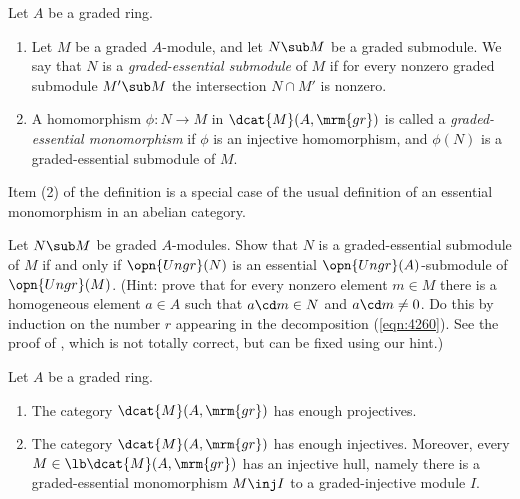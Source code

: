 \begin{dfn} \label{dfn:4260}
Let $A$ be a graded ring.
\begin{enumerate}
\item Let $M$ be a graded $A$-module, and let $N \sub M$ 
be a graded submodule. We say that $N$ is a 
{\em graded-essential submodule}%
of $M$ if for every nonzero graded submodule $M' \sub M$ the intersection 
$N \cap M'$ is nonzero. 

\item A homomorphism $\phi : N \to M$ in $\dcat{M}(A, \mrm{gr})$
is called a {\em graded-essential monomorphism}%
if $\phi$ is an injective 
homomorphism, and $\phi(N)$ is a graded-essential submodule of $M$.
\end{enumerate}
\end{dfn}

Item (2) of the definition is a special case of the usual definition of an 
essential monomorphism in an abelian category. 

\begin{exer} \label{exer}
Let $N \sub M$ be graded $A$-modules. Show that $N$ is a graded-essential 
submodule of $M$ if and only if $\opn{Ungr}(N)$ is an essential 
$\opn{Ungr}(A)$-submodule of $\opn{Ungr}(M)$.
(Hint: prove that for every nonzero element $m \in M$ there is a homogeneous 
element $a \in A$ such that $a \cd m \in N$ and $a \cd m \neq 0$. Do this by 
induction on the number $r$ appearing in the decomposition (\ref{eqn:4260}).
See the proof of \cite[Lemma 3.3.13]{NV}, which is not totally correct, but 
can be fixed using our hint.)
\end{exer}

\begin{prop} \label{prop:3735}
Let $A$ be a graded ring. 
\begin{enumerate}
\item The category $\dcat{M}(A, \mrm{gr})$ has enough projectives.

\item The category $\dcat{M}(A, \mrm{gr})$ has enough injectives. Moreover, 
every $M \in \lb \dcat{M}(A, \mrm{gr})$ has an injective hull, namely there is 
a graded-essential mono\-morphism $M \inj I$ to a graded-injective module $I$. 
\end{enumerate}
\end{prop}


